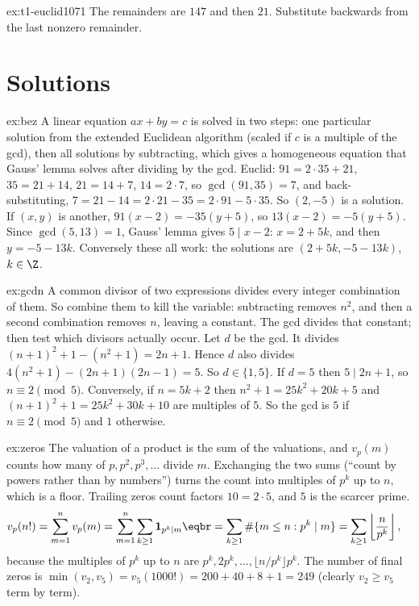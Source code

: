 \begin{hint}{ex:t1-euclid1071}
The remainders are $147$ and then $21$. Substitute backwards from the last nonzero remainder.
\end{hint}

\section{Solutions}

\begin{solution}{ex:bez}
\idea A linear equation $ax+by=c$ is solved in two steps: one particular solution from the extended Euclidean algorithm (scaled if $c$ is a multiple of the gcd), then all solutions by subtracting, which gives a homogeneous equation that Gauss' lemma solves after dividing by the gcd.
\writeup Euclid: $91=2\cdot35+21$, $35=21+14$, $21=14+7$, $14=2\cdot7$, so $\gcd(91,35)=7$, and back-substituting,
$7=21-14=2\cdot21-35=2\cdot91-5\cdot35$. So $(2,-5)$ is a solution. If $(x,y)$ is another, $91(x-2)=-35(y+5)$, so $13(x-2)=-5(y+5)$. Since $\gcd(5,13)=1$, Gauss' lemma gives $5\mid x-2$: $x=2+5k$, and then $y=-5-13k$. Conversely these all work: the solutions are $(2+5k,-5-13k)$, $k\in\Z$.
\end{solution}

\begin{solution}{ex:gcdn}
\idea A common divisor of two expressions divides every integer combination of them. So combine them to kill the variable: subtracting removes $n^2$, and then a second combination removes $n$, leaving a constant. The gcd divides that constant; then test which divisors actually occur.
\writeup Let $d$ be the gcd. It divides $(n+1)^2+1-(n^2+1)=2n+1$. Hence $d$ also divides $4(n^2+1)-(2n+1)(2n-1)=5$. So $d\in\{1,5\}$. If $d=5$ then $5\mid2n+1$, so $n\equiv2\pmod5$. Conversely, if $n=5k+2$ then $n^2+1=25k^2+20k+5$ and $(n+1)^2+1=25k^2+30k+10$ are multiples of $5$. So the gcd is $5$ if $n\equiv2\pmod5$ and $1$ otherwise.
\end{solution}

\begin{solution}{ex:zeros}
\idea The valuation of a product is the sum of the valuations, and $v_p(m)$ counts how many of $p,p^2,p^3,\dots$ divide $m$. Exchanging the two sums (``count by powers rather than by numbers'') turns the count into multiples of $p^k$ up to $n$, which is a floor. Trailing zeros count factors $10=2\cdot5$, and $5$ is the scarcer prime.
\writeup
\[\begin{aligned}v_p(n!)&=\sum_{m=1}^nv_p(m)=\sum_{m=1}^n\sum_{k\ge1}\mathbf 1_{p^k\mid m}\eqbr=\sum_{k\ge1}\#\{m\le n:p^k\mid m\}=\sum_{k\ge1}\left\lfloor\frac n{p^k}\right\rfloor,\end{aligned}\]
because the multiples of $p^k$ up to $n$ are $p^k,2p^k,\dots,\lfloor n/p^k\rfloor p^k$.
The number of final zeros is $\min(v_2,v_5)=v_5(1000!)=200+40+8+1=249$ (clearly $v_2\ge v_5$ term by term).
\end{solution}

